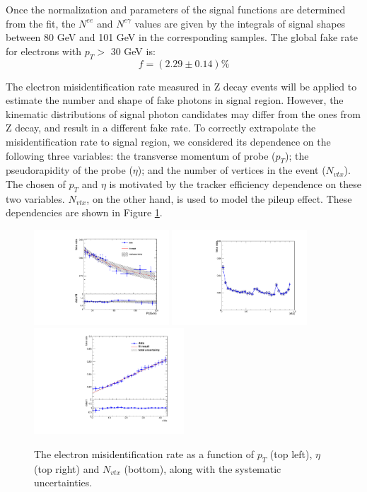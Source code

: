 \documentclass[thesis.tex]{subfiles}
\renewcommand\_{\textunderscore\allowbreak}
\begin{document}
Once the normalization and parameters of the signal functions are determined from the fit, the $N^{ee}$ and $N^{e\gamma}$ values are given by the integrals of signal shapes between 80 GeV and 101 GeV in the corresponding samples. The global fake rate for electrons with $p_T >$ 30 GeV is: 
\begin{equation}
        f = (2.29 \pm 0.14)\%
\end{equation}

The electron misidentification rate measured in Z decay events will be applied to estimate the number and shape of fake photons in signal region. However, the kinematic distributions of signal photon candidates may differ from the ones from Z decay, and result in a different fake rate. To correctly extrapolate the misidentification rate to signal region, we considered its dependence on the following three variables: the transverse momentum of probe ($p_T$); the pseudorapidity of the probe ($\eta$); and the number of vertices in the event ($N_{vtx}$). The chosen of $p_T$ and $\eta$ is motivated by the tracker efficiency dependence on these two variables. $N_{vtx}$, on the other hand, is used to model the pileup effect. These dependencies are shown in Figure \ref{fig:elefakepho_rate_pt}.


\begin{figure}[hbtp]
  \centering
    \includegraphics[width=0.45\textwidth]{Figures/elefake_pt_systematic_data.pdf}
    \includegraphics[width=0.45\textwidth]{Figures/elefake_eta_systematic_data.pdf}
     \includegraphics[width=0.5\textwidth]{Figures/elefake_vtx_systematic.pdf}
  \caption{The electron misidentification rate as a function of $p_T$ (top left), $\eta$ (top right) and $N_{vtx}$ (bottom), along with the systematic uncertainties.}
  \label{fig:elefakepho_rate_pt}
\end{figure}
\end{document}
